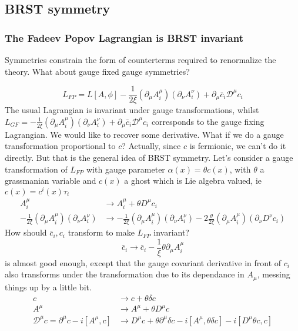 \documentclass[a4paper]{book}
\theoremstyle{definition}
\theoremstyle{remark}
\begin{document}
\subsection{BRST symmetry}
\subsubsection{The Fadeev Popov Lagrangian is BRST invariant}

Symmetries constrain the form of counterterms required to renormalize the theory. What about gauge fixed gauge symmetries? 

\begin{equation}
    L_{FP} = L[A, \phi] - \frac{1}{2\xi}(\partial_\mu A^\mu_i)(\partial_\nu A^\nu_i) + \partial_\mu \bar{c}_i \mathcal D^\mu c_i
\end{equation}
The usual Lagrangian is invariant under gauge transformations, whilst $L_{GF} = - \frac{1}{2\xi}(\partial_\mu A^\mu_i)(\partial_\nu A^\nu_i) + \partial_\mu \bar{c}_i \mathcal D^\mu c_i$ corresponds to the gauge fixing Lagrangian. We would like to recover some derivative. What if we do a gauge transformation proportional to $c$? Actually, since $c$ is fermionic, we can't do it directly. But that is the general idea of BRST symmetry. Let's consider a gauge transformation of $L_{FP}$ with gauge parameter $\alpha(x) = \theta c(x)$, with $\theta$ a grassmanian variable and $c(x)$ a ghost which is Lie algebra valued, ie $c(x) = c^i(x)\tau_i$
\begin{equation}
    \begin{aligned}
        A^\mu_i &\rightarrow A^\mu_i + \theta D^\mu c_i \\
        - \frac{1}{2\xi}(\partial_\mu A^\mu_i)(\partial_\nu A^\nu_i) &\rightarrow - \frac{1}{2\xi}(\partial_\mu A^\mu_i)(\partial_\nu A^\nu_i) - 2\frac{\theta}{2\xi} (\partial_\mu A^\mu_i)(\partial_\nu D^\nu c_i)
    \end{aligned}
\end{equation}
How should $\bar{c}_i, c_i$ transform to make $L_{FP}$ invariant? 
\begin{equation}
    \bar{c}_i \rightarrow \bar{c}_i - \frac{1}{\xi} \theta \partial_\mu A^\mu_i
\end{equation}
is almost good enough, except that the gauge covariant derivative in front of $c_i$ also transforms under the transformation due to its dependance in $A_\mu$, messing things up by a little bit. 
\begin{equation}
    \begin{aligned}
        c &\rightarrow c + \theta \delta c \\ 
        A^\mu &\rightarrow A^\mu + \theta D^\mu c\\
        \mathcal D^\mu c = \partial^\mu c - i[A^\mu, c] &\rightarrow D^\mu c + \theta \partial^\mu \delta c - i[A^\mu, \theta \delta c ] - i [D^\mu \theta c, c]
    \end{aligned}
\end{equation}
\end{document}

